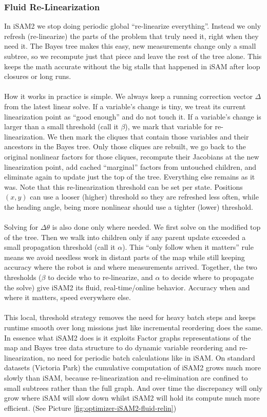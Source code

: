 \subsubsection{Fluid Re-Linearization}
In iSAM2 we stop doing periodic global ``re-linearize everything''. Instead we only refresh (re-linearize) the parts of the problem that truly need it, right when they need it. The Bayes tree makes this easy, new measurements change only a small subtree, so we recompute just that piece and leave the rest of the tree alone. This keeps the math accurate without the big stalls that happened in iSAM after loop closures or long runs. \cite{iSAM2_paper,Bayes_tree_for_SLAM_paper}
\\ \\ 
How it works in practice is simple. We always keep a running correction vector $\Delta$ from the latest linear solve. If a variable's change is tiny, we treat its current linearization point as ``good enough'' and do not touch it. If a variable's change is larger than a small threshold (call it $\beta$), we mark that variable for re-linearization. We then mark the cliques that contain those variables and their ancestors in the Bayes tree. Only those cliques are rebuilt, we go back to the original nonlinear factors for those cliques, recompute their Jacobians at the new linearization point, add cached ``marginal'' factors from untouched children, and eliminate again to update just the top of the tree. Everything else remains as it was. Note that this re-linearization threshold can be set per state. Positions $(x,y)$ can use a looser (higher) threshold so they are refreshed less often, while the heading angle, being more nonlinear should use a tighter (lower) threshold. \cite{Bayes_tree_for_SLAM_paper}
\\ \\
Solving for $\Delta\theta$ is also done only where needed. We first solve on the modified top of the tree. Then we walk into children only if any parent update exceeded a small propagation threshold (call it $\alpha$). This ``only follow when it matters'' rule means we avoid needless work in distant parts of the map while still keeping accuracy where the robot is and where measurements arrived. Together, the two thresholds ($\beta$ to decide who to re-linearize, and $\alpha$ to decide where to propagate the solve) give iSAM2 its fluid, real-time/online behavior. Accuracy when and where it matters, speed everywhere else.
\\ \\
This local, threshold strategy removes the need for heavy batch steps and keeps runtime smooth over long missions just like incremental reordering does the same. In essence what iSAM2 does is it exploits Factor graphs representations of the map and Bayes tree data structure to do dynamic variable reordering and re-linearization, no need for periodic batch calculations like in iSAM. On standard datasets (Victoria Park) the cumulative computation of iSAM2 grows much more slowly than iSAM, because re-linearization and re-elimination are confined to small subtrees rather than the full graph. And over time the discrepancy will only grow where iSAM will slow down whilst iSAM2 will hold its compute much more efficient. (See Picture \ref{fig:optimizer-iSAM2-fluid-relin})

